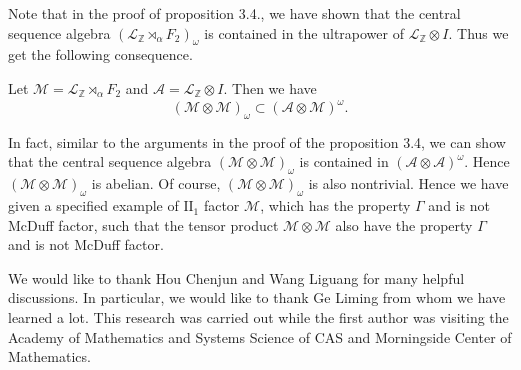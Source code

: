 \documentclass[12pt]{article}
\begin{document}
Note that in the proof of proposition 3.4., we have shown that the
central sequence algebra
$(\mathcal{L}_{\mathbb{Z}}\rtimes_{\alpha}F_{2})_{\omega}$ is
contained in the ultrapower of $\mathcal{L}_{\mathbb{Z}}\otimes I$.
Thus we get the following consequence.\vskip6pt

 Let
$\mathcal{M}=\mathcal{L}_{\mathbb{Z}}\rtimes_{\alpha}F_{2}$ and
$\mathcal{A}=\mathcal{L}_{\mathbb{Z}}\otimes I$. Then we have
$$(\mathcal{M}\otimes\mathcal{M})_{\omega}\subset(\mathcal{A}\otimes\mathcal{M})^{\omega}.$$
\vskip6pt

In fact, similar to the arguments in the proof of the proposition
3.4, we can show that the central sequence algebra
$(\mathcal{M}\otimes\mathcal{M})_{\omega}$ is contained in
$(\mathcal{A}\otimes\mathcal{A})^{\omega}$. Hence
$(\mathcal{M}\otimes\mathcal{M})_{\omega}$ is abelian. Of course,
$(\mathcal{M}\otimes\mathcal{M})_{\omega}$ is also nontrivial. Hence
we have given a specified example of $\mathrm{II}_{1}$ factor
$\mathcal{M}$, which has the property $\Gamma$ and is not McDuff
factor, such that the tensor product $\mathcal{M}\otimes\mathcal{M}$
also have the property $\Gamma$ and is not McDuff factor.\vskip6pt

 \vskip6pt

We would like to thank Hou Chenjun and Wang Liguang for many helpful
discussions. In particular, we would like to thank Ge Liming from
whom we have learned a lot. This research was carried out while the
first author was visiting the Academy of Mathematics and Systems
Science of CAS and Morningside Center of Mathematics.
\end{document}

